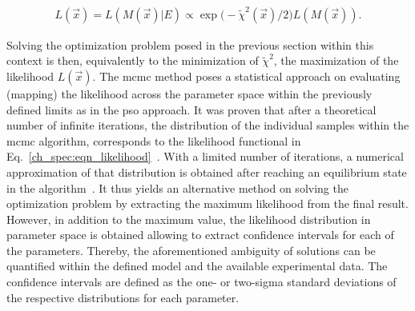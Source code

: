 \begin{align}
 L(\vec{x}) = L(M(\vec{x}) | E) \propto \exp \big(- \tilde{\chi}^2(\vec{x}) / 2 \big) L(M(\vec{x})) \text{.} \label{ch_spec:eqn_likelihood}
\end{align}

Solving the optimization problem posed in the previous section within this context is then, equivalently to the minimization of $\tilde{\chi}^2$, the maximization of the likelihood $L(\vec{x})$. The \gls{mcmc} method poses a statistical approach on evaluating (mapping) the likelihood across the parameter space within the previously defined limits as in the \gls{pso} approach. It was proven that after a theoretical number of infinite iterations, the distribution of the individual samples within the \gls{mcmc} algorithm, corresponds to the likelihood functional in Eq.~\eqref{ch_spec:eqn_likelihood}~\cite{cox_theoretical_1979, mackay_information_2003}. With a limited number of iterations, a numerical approximation of that distribution is obtained after reaching an equilibrium state in the algorithm~\cite{foreman-mackey_emcee:_2013}. It thus yields an alternative method on solving the optimization problem by extracting the maximum likelihood from the final result. However, in addition to the maximum value, the likelihood distribution in parameter space is obtained allowing to extract confidence intervals for each of the parameters. Thereby, the aforementioned ambiguity of solutions can be quantified within the defined model and the available experimental data. The confidence intervals are defined as the one- or two-sigma standard deviations of the respective distributions for each parameter.

